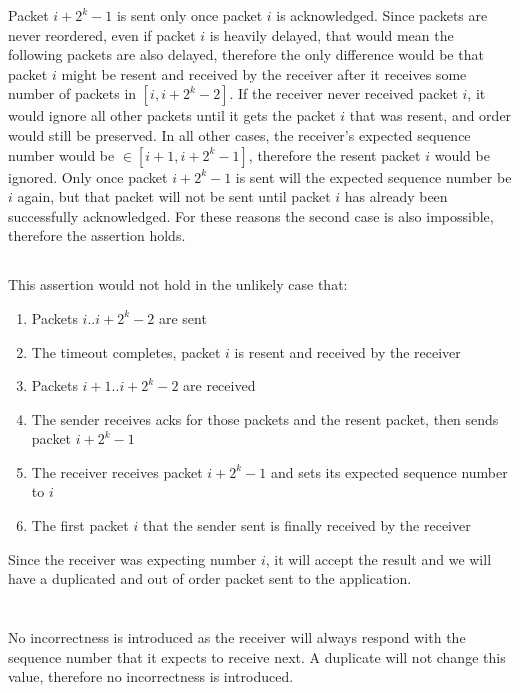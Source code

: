 \documentclass[12pt]{article}
\begin{document}
Packet $i + 2^k - 1$ is sent only once packet $i$ is acknowledged.
Since packets are never reordered, even if packet $i$ is heavily delayed, that
would mean the following packets are also delayed, therefore the only difference
would be that packet $i$ might be resent and received by the receiver after it
receives some number of packets in $[i, i + 2^k - 2]$.  If the receiver never
received packet $i$, it would ignore all other packets until it gets the packet
$i$ that was resent, and order would still be preserved.  In all other cases,
the receiver's expected sequence number would be $\in [i + 1, i + 2^k - 1]$,
therefore the resent packet $i$ would be ignored.  Only once packet $i + 2^k -
1$ is sent will the expected sequence number be $i$ again, but that packet will
not be sent until packet $i$ has already been successfully acknowledged.  For
these reasons the second case is also impossible, therefore the assertion holds.


\subsection{}
This assertion would not hold in the unlikely case that:
\begin{enumerate}
      \item Packets $i .. i + 2^k - 2$ are sent
      \item The timeout completes, packet $i$ is resent and received by the
receiver
      \item Packets $i + 1 .. i + 2^k - 2$ are received
      \item The sender receives acks for those packets and the resent packet,
         then sends packet $i + 2^k - 1$
      \item The receiver receives packet $i + 2^k - 1$ and sets its expected
         sequence number to $i$
      \item The first packet $i$ that the sender sent is finally received by the
         receiver
\end{enumerate}
Since the receiver was expecting number $i$, it will accept the result and we
will have a duplicated and out of order packet sent to the application.


\section{}
\subsection{}
No incorrectness is introduced as the receiver will always respond with the
sequence number that it expects to receive next.  A duplicate will not change
this value, therefore no incorrectness is introduced.
\end{document}

